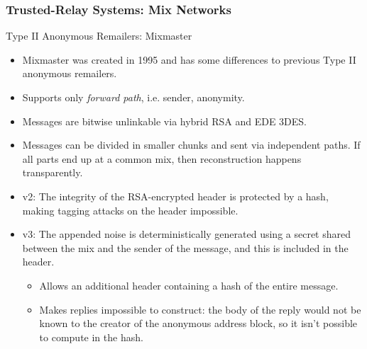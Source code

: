 \begin{frame}
  \frametitle{Trusted-Relay Systems: Mix Networks}

  \begin{block}{Type II Anonymous Remailers: Mixmaster}
    \begin{itemize}
    \item Mixmaster was created in 1995 and has some differences to previous
      Type II anonymous remailers.
    \item<2-> Supports only \emph{forward path}, i.e. sender, anonymity.
    \item<3-> Messages are bitwise unlinkable via hybrid RSA and EDE 3DES.
    \item<4-> Messages can be divided in smaller chunks and sent via independent
      paths.  If all parts end up at a common mix, then reconstruction happens
      transparently.
    \item<5-> v2: The integrity of the RSA-encrypted header is protected by a
      hash, making tagging attacks on the header impossible.
    \item<6-> v3: The appended noise is deterministically generated using a
      secret shared between the mix and the sender of the message, and this is included in
      the header.
      \begin{itemize}
      \item<7-> Allows an additional header containing a hash of the entire message.
      \item<8-> Makes replies impossible to construct: the body of the reply
        would not be known to the creator of the anonymous address block, so it
        isn't possible to compute in the hash.
      \end{itemize}
  \end{itemize}
  \end{block}
\end{frame}


